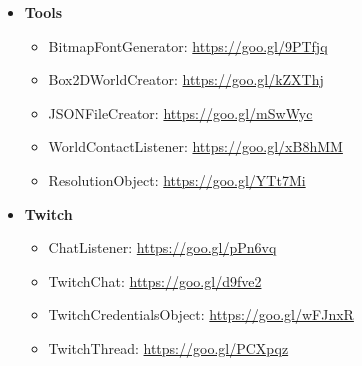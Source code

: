 \documentclass[12p]{article}
\begin{document}
\begin{itemize}
    \item \textbf{Tools}
    \begin{itemize}
        \item BitmapFontGenerator: \url{https://goo.gl/9PTfjq}
        \item Box2DWorldCreator: \url{https://goo.gl/kZXThj}
        \item JSONFileCreator: \url{https://goo.gl/mSwWyc}
        \item WorldContactListener: \url{https://goo.gl/xB8hMM}
        \item ResolutionObject: \url{https://goo.gl/YTt7Mi}
    \end{itemize}
    
    \item \textbf{Twitch}
    \begin{itemize}
        \item ChatListener: \url{https://goo.gl/pPn6vq}
        \item TwitchChat: \url{https://goo.gl/d9fve2}
        \item TwitchCredentialsObject: \url{https://goo.gl/wFJnxR}
        \item TwitchThread: \url{https://goo.gl/PCXpqz}
    \end{itemize}
\end{itemize}

\end{document}
